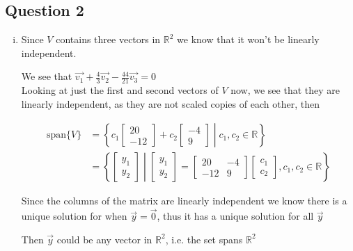 \documentclass{article}
\begin{document}
\subsection*{Question 2}
\begin{enumerate}[(i)]
    \item Since \(V\) contains three vectors in \(\mathbb{R}^2\) we know that it won't
    be linearly independent.

    We see that \(\vec{v_1} + \frac{4}{3}\vec{v_2} - \frac{44}{21}\vec{v_3} = 0\)
    \\

    Looking at just the first and second vectors of \(V\) now, we see that they are linearly
    independent, as they are not scaled copies of each other, then

    \begin{align*}
        \text{span}\{{V}\} &= \left\{c_1\begin{bmatrix}
        20\\-12
        \end{bmatrix} + c_2\begin{bmatrix}
        -4\\9
        \end{bmatrix} \middle| c_1,c_2 \in \mathbb{R}\right\}
        \\
        & = \left\{\begin{bmatrix}
        y_1\\y_2
        \end{bmatrix} \middle| \begin{bmatrix}
        y_1\\y_2
        \end{bmatrix} = 
        \begin{bmatrix}
          20 & -4 \\
        -12 & 9
        \end{bmatrix}
        \begin{bmatrix}
        c_1\\c_2
        \end{bmatrix}, c_1,c_2 \in \mathbb{R}\right\}
    \end{align*}

    Since the columns of the matrix are linearly independent
    we know there is a unique solution for when \(\vec{y} = \vec{0}\), thus it has a unique solution for all \(\vec{y}\)

    Then \(\vec{y}\) could be any vector in \(\mathbb{R}^2\), i.e. the set spans \(\mathbb{R}^2\)
    

\end{enumerate}
\end{document}
